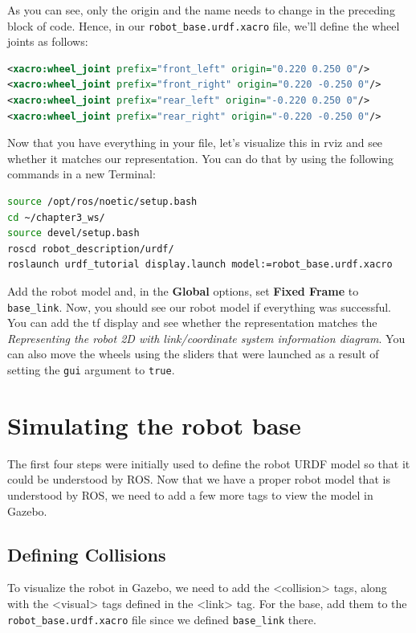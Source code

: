 \documentclass[letterpaper,pdftex]{article}
\begin{document}
As you can see, only the origin and the name needs to change in the preceding block of code. Hence, in our \verb|robot_base.urdf.xacro| file, we'll define the wheel joints as follows:

\begin{lstlisting}[language=xml]
<xacro:wheel_joint prefix="front_left" origin="0.220 0.250 0"/>
<xacro:wheel_joint prefix="front_right" origin="0.220 -0.250 0"/>
<xacro:wheel_joint prefix="rear_left" origin="-0.220 0.250 0"/>
<xacro:wheel_joint prefix="rear_right" origin="-0.220 -0.250 0"/>
\end{lstlisting}

Now that you have everything in your file, let's visualize this in rviz and see whether it matches our representation. You can do that by using the following commands in a new Terminal:

\begin{lstlisting}[language=bash]
source /opt/ros/noetic/setup.bash
cd ~/chapter3_ws/ 
source devel/setup.bash 
roscd robot_description/urdf/
roslaunch urdf_tutorial display.launch model:=robot_base.urdf.xacro
\end{lstlisting}

Add the robot model and, in the \textbf{Global} options, set \textbf{Fixed Frame} to \verb|base_link|. Now, you should see our robot model if everything was successful. You can add the tf display and see whether the representation matches the \textit{Representing the robot 2D with link/coordinate system information diagram}. You can also move the wheels using the sliders that were launched as a result of setting the \verb|gui| argument to \verb|true|.

\section{Simulating the robot base}

The first four steps were initially used to define the robot URDF model so that it could be understood by ROS. Now that we have a proper robot model that is understood by ROS, we need to add a few more tags to view the model in Gazebo.

\subsection{Defining Collisions}

To visualize the robot in Gazebo, we need to add the <collision> tags, along with the <visual> tags defined in the <link> tag. For the base, add them to the \verb|robot_base.urdf.xacro| file since we defined \verb|base_link| there.
\end{document}
